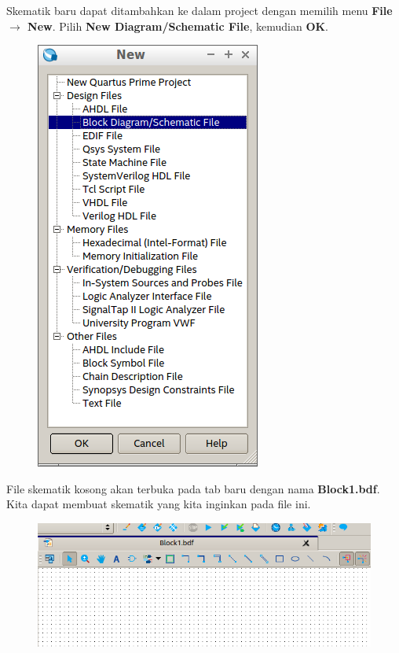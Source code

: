 Skematik baru dapat ditambahkan ke dalam project dengan memilih menu
\textbf{File $\rightarrow$ New}. Pilih \textbf{New Diagram/Schematic File}, kemudian
\textbf{OK}.

\begin{figure}[H]
\centering
\includegraphics[scale=0.5]{images/NewSchematic.png}
\par
\end{figure}

File skematik kosong akan terbuka pada tab baru dengan nama \textbf{Block1.bdf}.
Kita dapat membuat skematik yang kita inginkan pada file ini.

\begin{figure}[H]
\centering
\includegraphics[scale=0.5]{images/EmptySchematic.png}
\par
\end{figure}

